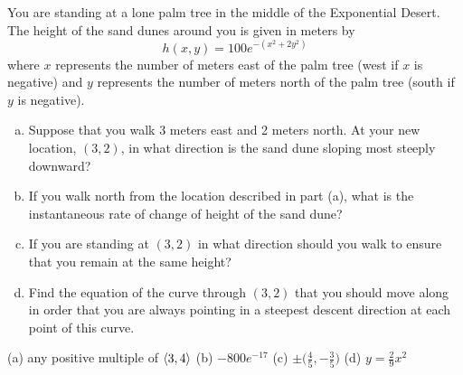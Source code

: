 \begin{question} [M200 2002D] %
 You are standing at a lone palm tree in the middle of the
Exponential Desert. The height of the sand dunes around you is given in
meters by 
$$
h(x,y)=100 e^{-(x^2+2y^2)}
$$
where $x$ represents the number of meters east of the palm tree (west if
$x$ is negative) and $y$ represents the number of meters north of the palm
tree (south if $y$ is negative).
\begin{enumerate}[(a)]
\item 
Suppose that you walk $3$ meters east and 2 meters north.
At your new location, $(3,2)$, in what direction is the sand dune sloping
most steeply downward?

\item
If you walk north from the location described in part (a),
what is the instantaneous rate of change of height of the sand dune?

\item
 If you are standing at $(3,2)$ in what direction should you
walk to ensure that you remain at the same height?

\item
 Find the equation of the curve through $(3,2)$ that you should
move along in order that you are always pointing in a steepest descent
direction at each point of this curve.
\end{enumerate}
\end{question}

%

\begin{answer}
(a) any positive multiple of $\left< 3,4\right>$\qquad
(b) $-800 e^{-17}$\qquad
(c) $\pm\big(\frac{4}{5},-\frac{3}{5}\big)$\qquad
(d) $y=\frac{2}{9}x^2$
\end{answer}

